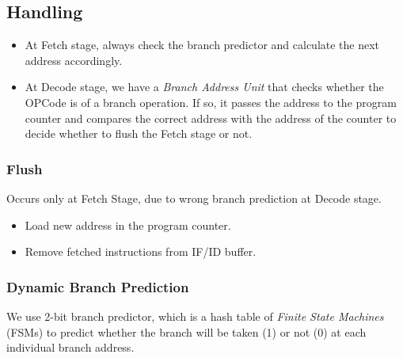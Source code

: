 \subsection{Handling}
\begin{itemize}
    \item At Fetch stage, always check the branch predictor and calculate the next address accordingly.
    \item At Decode stage, we have a \emph{Branch Address Unit} that checks whether the OPCode is of a branch operation. If so, it passes the address to the program counter and compares the correct address with the address of the counter to decide whether to flush the Fetch stage or not. 
\end{itemize}

\subsubsection{Flush}
Occurs only at Fetch Stage, due to wrong branch prediction at Decode stage.
\begin{itemize}
    \item Load new address in the program counter.
    \item Remove fetched instructions from IF/ID buffer.
\end{itemize}

\subsubsection{Dynamic Branch Prediction}
We use 2-bit branch predictor, which is a hash table of \emph{Finite State Machines} (FSMs) to predict whether the branch will be taken (1) or not (0) at each individual branch address.